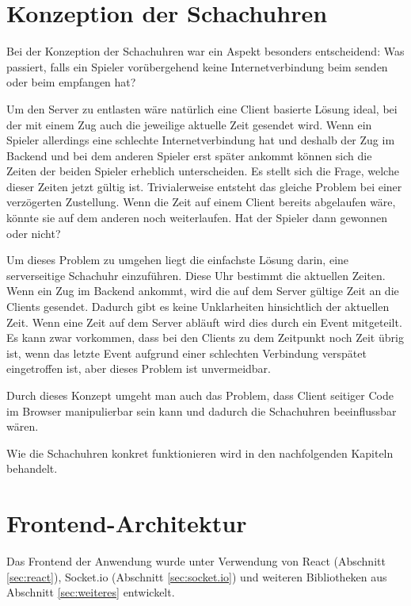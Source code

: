 \section{Konzeption der Schachuhren}
Bei der Konzeption der Schachuhren war ein Aspekt besonders entscheidend: Was passiert, falls ein Spieler vorübergehend keine Internetverbindung beim senden oder beim empfangen hat?

Um den Server zu entlasten wäre natürlich eine Client basierte Lösung ideal, bei der mit einem Zug auch die jeweilige aktuelle Zeit gesendet wird. Wenn ein Spieler allerdings eine schlechte Internetverbindung hat und deshalb der Zug im Backend und bei dem anderen Spieler erst später ankommt können sich die Zeiten der beiden Spieler erheblich unterscheiden. Es stellt sich die Frage, welche dieser Zeiten jetzt gültig ist. Trivialerweise entsteht das gleiche Problem bei einer verzögerten Zustellung. Wenn die Zeit auf einem Client bereits abgelaufen wäre, könnte sie auf dem anderen noch weiterlaufen. Hat der Spieler dann gewonnen oder nicht?

Um dieses Problem zu umgehen liegt die einfachste Lösung darin, eine serverseitige Schachuhr einzuführen. Diese Uhr bestimmt die aktuellen Zeiten. Wenn ein Zug im Backend ankommt, wird die auf dem Server gültige Zeit an die Clients gesendet. Dadurch gibt es keine Unklarheiten hinsichtlich der aktuellen Zeit. Wenn eine Zeit auf dem Server abläuft wird dies durch ein Event mitgeteilt.  Es kann zwar vorkommen, dass bei den Clients zu dem Zeitpunkt noch Zeit übrig ist, wenn das letzte Event aufgrund einer schlechten Verbindung verspätet eingetroffen ist, aber dieses Problem ist unvermeidbar.

Durch dieses Konzept umgeht man auch das Problem, dass Client seitiger Code im Browser manipulierbar sein kann und dadurch die Schachuhren beeinflussbar wären.

Wie die Schachuhren konkret funktionieren wird in den nachfolgenden Kapiteln behandelt.

    \section{Frontend-Architektur}
Das Frontend der Anwendung wurde unter Verwendung von React (Abschnitt \ref{sec:react}), Socket.io (Abschnitt \ref{sec:socket.io}) und weiteren Bibliotheken aus Abschnitt \ref{sec:weiteres} entwickelt.


